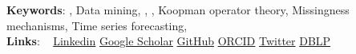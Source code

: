 \textbf{Keywords}:
, Data mining, , , Koopman operator theory, Missingness mechanisms, Time series forecasting, 
\vspace{0.2em}
\\
\textbf{Links}:
~\faLinkedin{} \href{https://www.linkedin.com/in/\Linkedin}{Linkedin}
\Separator{}
\faGraduationCap{} \href{https://scholar.google.com/citations?hl=en&user=\Gscholar}{Google Scholar}
\Separator{}
\faGithub{} \href{https://github.com/\GitHubProfile}{GitHub}
\Separator{}
\faOrcid{} \href{https://orcid.org/\ORCID}{ORCID}
\Separator{}
\faTwitter{} \href{https://x.com/\Twitter}{Twitter}
\Separator{}
\faDblp{} \href{https://dblp.org/pid/363/1658.html}{DBLP}
\vspace{0.5em}